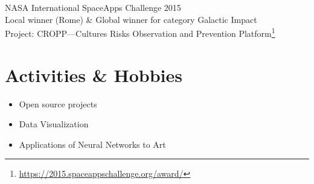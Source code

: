 \documentclass[margin]{res}
\begin{document}
\begin{resume}
NASA International SpaceApps Challenge \hfill 2015 \\
Local winner (Rome) \& Global winner for category Galactic Impact \\
Project: CROPP---Cultures Risks Observation and Prevention Platform\footnote{\url{https://2015.spaceappschallenge.org/award/}}

\section{Activities \& Hobbies}
\begin{itemize} \itemsep-2pt
    \item Open source projects
    \item Data Visualization
    \item Applications of Neural Networks to Art
\end{itemize}

\end{resume} 
\end{document}
